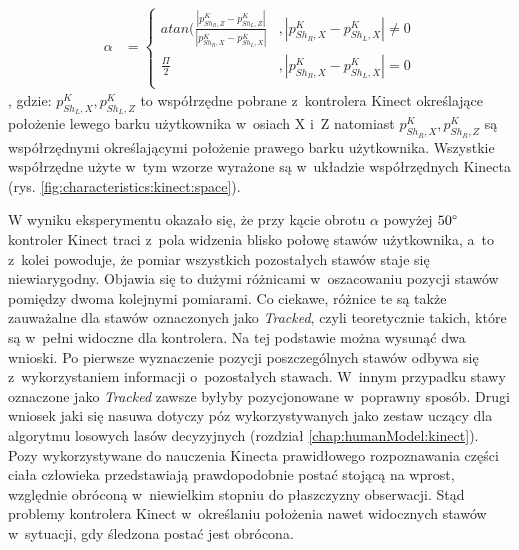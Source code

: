 \begin{equation}
	\label{eq:characteristics:kinect:bodyRotationAngle}
	\begin{split}
		\alpha &= 
		\begin{cases} 
			atan(\frac{|p^K_{{Sh}_R,Z} - p^K_{{Sh}_L,Z}|}{|p^K_{{Sh}_R,X} - p^K_{{Sh}_L,X}|} & , |p^K_{{Sh}_R,X} - p^K_{{Sh}_L,X}| \neq 0 \\
			\frac{\Pi}{2}                                                                    & , |p^K_{{Sh}_R,X} - p^K_{{Sh}_L,X}| = 0    \\		
		\end{cases}
	\end{split}
\end{equation}
, gdzie: $p^K_{{Sh}_L,X}, p^K_{{Sh}_L,Z}$ to współrzędne pobrane z~kontrolera Kinect określające położenie lewego barku użytkownika w~osiach X i~Z natomiast $	p^K_{{Sh}_R,X}, p^K_{{Sh}_R,Z}$	są współrzędnymi określającymi położenie prawego barku użytkownika. Wszystkie współrzędne użyte w~tym wzorze wyrażone są w~układzie współrzędnych Kinecta (rys. \ref{fig:characteristics:kinect:space}).																																			
																																					
W wyniku eksperymentu okazało się, że przy kącie obrotu $\alpha$ powyżej $50\degree$ kontroler Kinect traci z~pola widzenia blisko połowę stawów użytkownika, a~to z~kolei powoduje, że pomiar wszystkich pozostałych stawów staje się niewiarygodny. Objawia się to dużymi różnicami w~oszacowaniu pozycji stawów pomiędzy dwoma kolejnymi pomiarami. Co ciekawe, różnice te są także zauważalne dla stawów oznaczonych jako \emph{Tracked}, czyli teoretycznie takich, które są w~pełni widoczne dla kontrolera. Na tej podstawie można wysunąć dwa wnioski. Po pierwsze wyznaczenie pozycji poszczególnych stawów odbywa się z~wykorzystaniem informacji o~pozostałych stawach. W~innym przypadku stawy oznaczone jako \emph{Tracked} zawsze byłyby pozycjonowane w~poprawny sposób. Drugi wniosek jaki się nasuwa dotyczy póz wykorzystywanych jako zestaw uczący dla algorytmu losowych lasów decyzyjnych (rozdział \ref{chap:humanModel:kinect}). Pozy wykorzystywane do nauczenia Kinecta prawidłowego rozpoznawania części ciała człowieka przedstawiają prawdopodobnie postać stojącą na wprost, względnie obróconą w~niewielkim stopniu do płaszczyzny obserwacji. Stąd problemy kontrolera Kinect w~określaniu położenia nawet widocznych stawów w~sytuacji, gdy śledzona postać jest obrócona.
																																					
